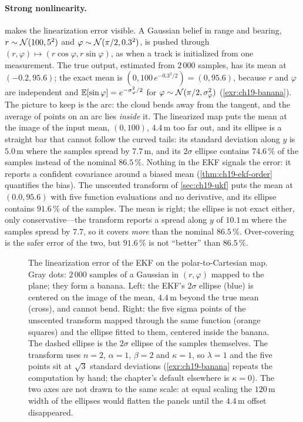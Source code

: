 \paragraph{Strong nonlinearity.}
 makes the linearization error visible. A
Gaussian belief in range and bearing, $r \sim \mathcal{N}(100, 5^2)$ and
$\varphi \sim \mathcal{N}(\pi/2, 0.3^2)$, is pushed through $(r, \varphi) \mapsto
(r\cos\varphi, r\sin\varphi)$, as when a track is initialized from one
measurement. The true output, estimated from
$2\,000$ samples, has its mean at $(-0.2, 95.6)$; the exact mean is
$(0, 100\,e^{-0.3^2/2}) = (0, 95.6)$, because $r$ and $\varphi$ are
independent and $\mathbb{E}[\sin\varphi] = e^{-\sigma_\varphi^2/2}$ for
$\varphi \sim \mathcal{N}(\pi/2, \sigma_\varphi^2)$
(\cref{exr:ch19-banana}). The picture to keep is the arc: the cloud bends
away from the tangent, and the average of points on an arc lies
\emph{inside} it. The linearized
map puts the mean at the image of the input mean, $(0, 100)$,
$4.4\,\mathrm{m}$ too far out, and its ellipse is a straight bar that cannot
follow the curved tails: its standard deviation along $y$ is $5.0\,\mathrm{m}$
where the samples spread by $7.7\,\mathrm{m}$, and its $2\sigma$ ellipse
contains $74.6\,\%$ of the samples instead of the nominal $86.5\,\%$. Nothing
in the EKF signals the error: it reports a confident covariance around a
biased mean (\cref{thm:ch19-ekf-order} quantifies the bias). The
unscented transform of \cref{sec:ch19-ukf} puts the mean at $(0.0, 95.6)$
with five function evaluations and no derivative, and its ellipse contains
$91.6\,\%$ of the samples. The mean is right; the ellipse is not exact
either, only conservative---the transform reports a spread along $y$ of
$10.1\,\mathrm{m}$ where the samples spread by $7.7$, so it covers
\emph{more} than the nominal $86.5\,\%$. Over-covering is the safer error
of the two, but $91.6\,\%$ is not ``better'' than $86.5\,\%$.

\begin{figure}[tb]
  \centering
  \caption{The linearization error of the EKF on the polar-to-Cartesian map.
  Gray dots: $2\,000$ samples of a Gaussian in $(r, \varphi)$ mapped to the
  plane; they form a banana. Left: the EKF's $2\sigma$ ellipse (blue) is
  centered on the image of the mean, $4.4\,\mathrm{m}$ beyond the true mean
  (cross), and cannot bend. Right: the five sigma points of the unscented
  transform mapped through the same function (orange squares) and the
  ellipse fitted to them, centered inside the banana. The dashed ellipse is
  the $2\sigma$ ellipse of the samples themselves. The transform uses
  $n = 2$, $\alpha = 1$, $\beta = 2$ and $\kappa = 1$, so $\lambda = 1$ and
  the five points sit at $\sqrt{3}$ standard deviations
  (\cref{exr:ch19-banana} repeats the computation by hand; the chapter's
  default elsewhere is $\kappa = 0$). The two axes are not drawn to the same
  scale: at equal scaling the $120\,\mathrm{m}$ width of the ellipses would
  flatten the panels until the $4.4\,\mathrm{m}$ offset disappeared.}
  \label{fig:ch19-linearisation}
\end{figure}

